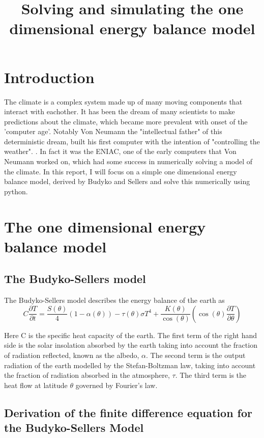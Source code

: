 \documentclass{article}%
\title{Solving and simulating the one dimensional energy balance model}%
\date{}
\begin{document}
%
\normalsize%
\maketitle%

%
\section{Introduction}%
\label{sec:Introduction}%
The climate is a complex system made up of many moving components that interact with eachother.
It has been the dream of many scientists to make predictions about the climate, which became more prevalent with onset of the 'computer age'. Notably Von Neumann the "intellectual father" of this deterministic dream, built his first computer with the
intention of "controlling the weather". \cite{Gleick}. In fact it was the ENIAC, one of the early computers that Von Neumann worked on, which had some success in numerically solving a model of the climate. \cite{Charney}
In this report, I will focus on a simple one dimensional energy balance model, derived by Budyko \cite{Budyko} and Sellers \cite{Sellers} and solve this numerically using python.
%
\section{The one dimensional energy balance model}

\subsection{The Budyko-Sellers model}
The Budyko-Sellers model describes the energy balance of the earth as
\begin{equation}
  C \frac{\partial T}{\partial t} = \frac{S(\theta)}{4} (1 - \alpha(\theta)) - \tau(\theta)\sigma T^{4} + \frac{K(\theta)}{\cos(\theta)} (\cos(\theta)\frac{\partial T}{\partial \theta})
\end{equation}

Here C is the specific heat capacity of the earth. The first term of the right hand side is the solar insolation absorbed by the earth taking into account the fraction of radiation reflected, known as the albedo, $ \alpha$. The second term is the output radiation of the earth modelled by the Stefan-Boltzman law, taking into account the fraction of radiation absorbed in the atmosphere, $\tau$. 
The third term is the heat flow at latitude $ \theta $ governed by Fourier's law. 

\subsection{Derivation of the finite difference equation for the Budyko-Sellers Model}%
\label{sec:Derivation of the finite difference equation for the Budyko-Sellers Model}%
\end{document}
